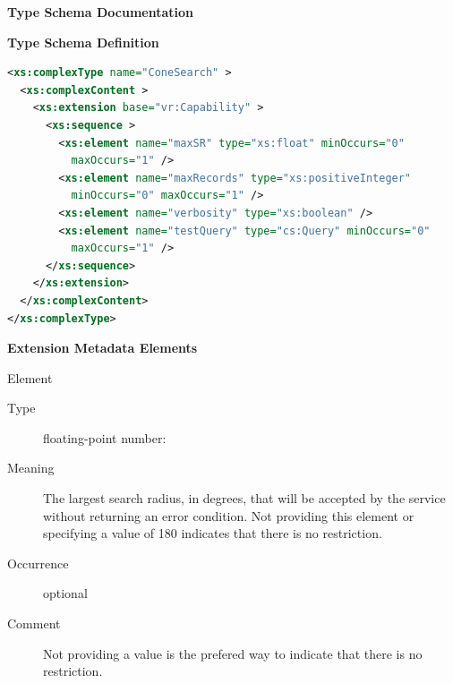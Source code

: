 \documentclass[11pt,a4paper]{ivoa}
\begin{document}
\begin{generated}
\begingroup
      	\renewcommand*\descriptionlabel[1]{%
      	\hbox to 5.5em{\emph{#1}\hfil}}\vspace{2ex}\noindent\textbf{ Type Schema Documentation}


\vspace{1ex}\noindent\textbf{ Type Schema Definition}

\begin{lstlisting}[language=XML,basicstyle=\footnotesize]
<xs:complexType name="ConeSearch" >
  <xs:complexContent >
    <xs:extension base="vr:Capability" >
      <xs:sequence >
        <xs:element name="maxSR" type="xs:float" minOccurs="0" 
          maxOccurs="1" />
        <xs:element name="maxRecords" type="xs:positiveInteger" 
          minOccurs="0" maxOccurs="1" />
        <xs:element name="verbosity" type="xs:boolean" />
        <xs:element name="testQuery" type="cs:Query" minOccurs="0"
          maxOccurs="1" />
      </xs:sequence>
    </xs:extension>
  </xs:complexContent>
</xs:complexType>
\end{lstlisting}

\vspace{0.5ex}\noindent\textbf{ Extension Metadata Elements}

\begingroup\small\begin{bigdescription}\item[Element \xmlel{maxSR}]
\begin{description}
\item[Type] floating-point number: 
\item[Meaning] 
                        The largest search radius, in degrees, that will be
                        accepted by the service without returning an error 
                        condition.  Not providing this element or 
                        specifying a value of 180 indicates that there
                        is no restriction.
                     
\item[Occurrence] optional
\item[Comment] 
                        Not providing a value is the prefered way to indicate
                        that there is no restriction. 
                     


\end{description}
\end{bigdescription}
\end{generated}
\end{document}
